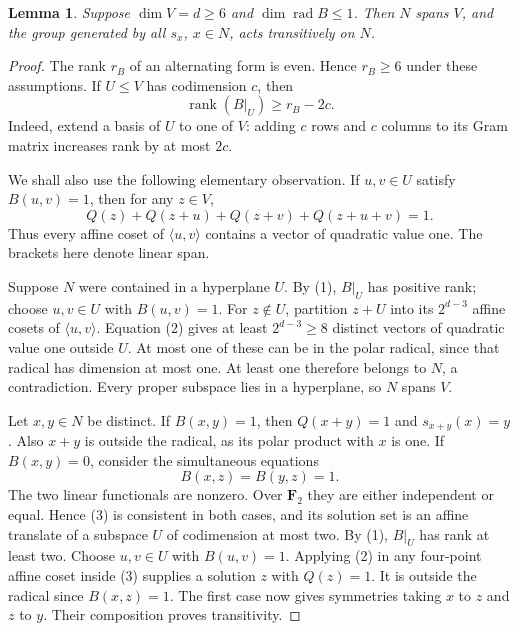 \documentclass[11pt,a4paper]{article}
\newtheorem{lemma}{Lemma}\newtheorem{theorem}[lemma]{Theorem}
\newcommand{\gen}[1]{\langle#1\rangle}
\begin{document}
\begin{lemma}\label{quad}
Suppose $\dim V=d\geq6$ and $\dim\operatorname{rad}B\leq1$.
Then $N$ spans $V$, and the group generated by all $s_x$, $x\in N$,
acts transitively on $N$.
\end{lemma}
\begin{proof}
The rank $r_B$ of an alternating form is even. Hence $r_B\geq6$
under these assumptions. If $U\leq V$ has codimension $c$, then
\[
 \operatorname{rank}(B|_U)\geq r_B-2c.                 \tag{1}
\]
Indeed, extend a basis of $U$ to one of $V$: adding $c$ rows
and $c$ columns to its Gram matrix increases rank by at most $2c$.

We shall also use the following elementary observation. If $u,v\in U$
satisfy $B(u,v)=1$, then for any $z\in V$,
\[
 Q(z)+Q(z+u)+Q(z+v)+Q(z+u+v)=1.                       \tag{2}
\]
Thus every affine coset of $\gen{u,v}$ contains a vector of
quadratic value one. The brackets here denote linear span.

Suppose $N$ were contained in a hyperplane $U$. By (1),
$B|_U$ has positive rank; choose $u,v\in U$ with $B(u,v)=1$.
For $z\notin U$, partition $z+U$ into its $2^{d-3}$ affine cosets
of $\gen{u,v}$. Equation (2) gives at least $2^{d-3}\geq8$
distinct vectors of quadratic value one outside $U$.
At most one of these can be in the polar radical, since that radical
has dimension at most one. At least one therefore belongs to $N$,
a contradiction. Every proper subspace lies in a hyperplane, so
$N$ spans $V$.

Let $x,y\in N$ be distinct. If $B(x,y)=1$, then $Q(x+y)=1$
and $s_{x+y}(x)=y$. Also $x+y$ is outside the radical, as its
polar product with $x$ is one.
If $B(x,y)=0$, consider the simultaneous equations
\[
                    B(x,z)=B(y,z)=1.                  \tag{3}
\]
The two linear functionals are nonzero. Over $\mathbf F_2$ they
are either independent or equal. Hence (3) is consistent in both
cases, and its solution set is an affine translate of a subspace
$U$ of codimension at most two. By (1), $B|_U$ has rank at least
two. Choose $u,v\in U$ with $B(u,v)=1$. Applying (2) in any
four-point affine coset inside (3) supplies a solution $z$ with
$Q(z)=1$. It is outside the radical since $B(x,z)=1$.
The first case now gives symmetries taking $x$ to $z$ and $z$ to
$y$. Their composition proves transitivity.
\end{proof}
\end{document}
